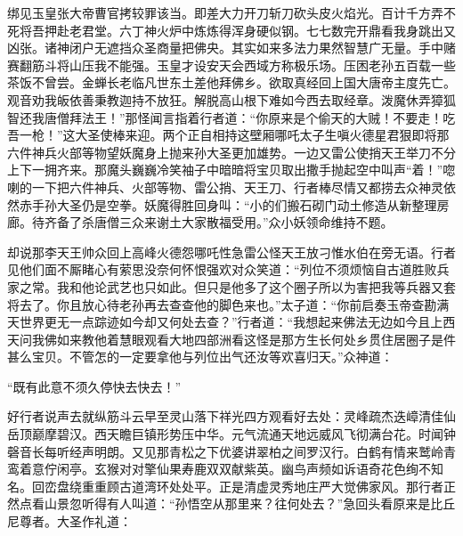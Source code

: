 \documentclass[12pt,UTF8]{ctexbook}
\begin{document}
绑见玉皇张大帝曹官拷较罪该当。即差大力开刀斩刀砍头皮火焰光。百计千方弄不死将吾押赴老君堂。六丁神火炉中炼炼得浑身硬似钢。七七数完开鼎看我身跳出又凶张。诸神闭户无遮挡众圣商量把佛央。其实如来多法力果然智慧广无量。手中赌赛翻筋斗将山压我不能强。玉皇才设安天会西域方称极乐场。压困老孙五百载一些茶饭不曾尝。金蝉长老临凡世东土差他拜佛乡。欲取真经回上国大唐帝主度先亡。观音劝我皈依善秉教迦持不放狂。解脱高山根下难如今西去取经章。泼魔休弄獐狐智还我唐僧拜法王！”那怪闻言指着行者道：“你原来是个偷天的大贼！不要走！吃吾一枪！”这大圣使棒来迎。两个正自相持这壁厢哪吒太子生嗔火德星君狠即将那六件神兵火部等物望妖魔身上抛来孙大圣更加雄势。一边又雷公使捎天王举刀不分上下一拥齐来。那魔头巍巍冷笑袖子中暗暗将宝贝取出撒手抛起空中叫声“着！”唿喇的一下把六件神兵、火部等物、雷公捎、天王刀、行者棒尽情又都捞去众神灵依然赤手孙大圣仍是空拳。妖魔得胜回身叫：“小的们搬石砌门动土修造从新整理房廊。待齐备了杀唐僧三众来谢土大家散福受用。”众小妖领命维持不题。

却说那李天王帅众回上高峰火德怨哪吒性急雷公怪天王放刁惟水伯在旁无语。行者见他们面不厮睹心有萦思没奈何怀恨强欢对众笑道：“列位不须烦恼自古道胜败兵家之常。我和他论武艺也只如此。但只是他多了这个圈子所以为害把我等兵器又套将去了。你且放心待老孙再去查查他的脚色来也。”太子道：“你前启奏玉帝查勘满天世界更无一点踪迹如今却又何处去查？”行者道：“我想起来佛法无边如今且上西天问我佛如来教他着慧眼观看大地四部洲看这怪是那方生长何处乡贯住居圈子是件甚么宝贝。不管怎的一定要拿他与列位出气还汝等欢喜归天。”众神道：

“既有此意不须久停快去快去！”

好行者说声去就纵筋斗云早至灵山落下祥光四方观看好去处：灵峰疏杰迭嶂清佳仙岳顶巅摩碧汉。西天瞻巨镇形势压中华。元气流通天地远威风飞彻满台花。时闻钟磬音长每听经声明朗。又见那青松之下优婆讲翠柏之间罗汉行。白鹤有情来鹫岭青鸾着意佇闲亭。玄猴对对擎仙果寿鹿双双献紫英。幽鸟声频如诉语奇花色绚不知名。回峦盘绕重重顾古道湾环处处平。正是清虚灵秀地庄严大觉佛家风。那行者正然点看山景忽听得有人叫道：“孙悟空从那里来？往何处去？”急回头看原来是比丘尼尊者。大圣作礼道：
\end{document}
